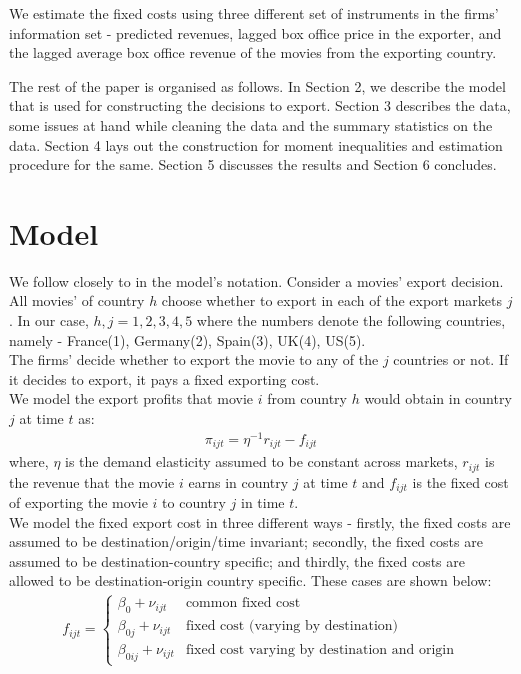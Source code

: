\documentclass[11pt, letterpaper]{article} \usepackage{amsmath}
\begin{document}
We estimate the fixed costs using three different set of instruments
in the firms' information set - predicted revenues, lagged box office
price in the exporter, and the lagged average box office revenue of
the movies from the exporting country.

The rest of the paper is organised as follows. In Section 2, we
describe the model that is used for constructing the decisions to
export. Section 3 describes the data, some issues at hand while
cleaning the data and the summary statistics on the data. Section 4
lays out the construction for moment inequalities and estimation
procedure for the same. Section 5 discusses the results and Section 6
concludes.
\section{Model}
We follow closely to \citep{dickstein2018} in the model's
notation. Consider a movies' export decision. All movies' of country
$h$ choose whether to export in each of the export markets $j$. In our
case, $h,j=1,2,3,4,5$ where the numbers denote the following
countries, namely - France(1), Germany(2), Spain(3), UK(4), US(5).\\
The firms' decide whether to export the movie to any of the $j$
countries or not. If it decides to export, it pays a fixed exporting
cost. \\
We model the export profits that movie $i$ from country $h$ would
obtain in country $j$ at time $t$ as:
\begin{align*}
  \pi_{ijt} = \eta^{-1}r_{ijt} - f_{ijt}
\end{align*}
where, $\eta$ is the demand elasticity assumed to be constant across
markets, $r_{ijt}$ is the revenue that the movie $i$ earns in country
$j$ at time $t$ and $f_{ijt}$ is the fixed cost of exporting the movie
$i$ to country $j$ in time $t$. \\
We model the fixed export cost in three different ways - firstly, the
fixed costs are assumed to be destination/origin/time invariant;
secondly, the fixed costs are assumed to be destination-country
specific; and thirdly, the fixed costs are allowed to be
destination-origin country specific. These cases are shown below:
\begin{align*}
  f_{ijt} = \begin{cases}
    \beta_0 + \nu_{ijt} & \text{common fixed cost}\\
    \beta_{0j} + \nu_{ijt} & \text{fixed cost (varying by destination)}\\
    \beta_{0ij} + \nu_{ijt} & \text{fixed cost varying by destination
      and origin}
  \end{cases}
\end{align*}
\end{document}
